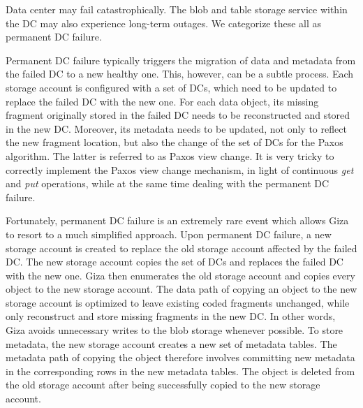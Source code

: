 Data center may fail catastrophically. The blob and table storage service within the DC may also experience long-term outages. We categorize these all as permanent DC failure.

Permanent DC failure typically triggers the migration of data and metadata from the failed DC to a new healthy one.
This, however, can be a subtle process.
Each storage account is configured with a set of DCs, which need to be updated to replace the failed DC with the new one.
For each data object, its missing fragment originally stored in the failed DC needs to be reconstructed and stored in the new DC.
Moreover, its metadata needs to be updated,
not only to reflect the new fragment location, but also the change of the set of DCs for the Paxos algorithm.
The latter is referred to as Paxos view change.
It is very tricky to correctly implement the Paxos view change mechanism, in light of continuous {\em get} and {\em put} operations, while at the same time dealing with the permanent DC failure.

Fortunately, permanent DC failure is an extremely rare event
which allows Giza to resort to a much simplified approach.
Upon permanent DC failure, a new storage account is created to replace the old storage account affected by the failed DC.
The new storage account copies the set of DCs and replaces the failed DC with the new one.
Giza then enumerates the old storage account and copies every object to the new storage account.
The data path of copying an object to the new storage account is optimized to leave existing coded fragments unchanged, while only reconstruct and store missing fragments in the new DC.
In other words, Giza avoids unnecessary writes to the blob storage whenever possible.
To store metadata, the new storage account creates a new set of metadata tables.
The metadata path of copying the object therefore involves committing new metadata in the corresponding rows in the new metadata tables. The object is deleted from the old storage account after being successfully copied to the new storage account.


